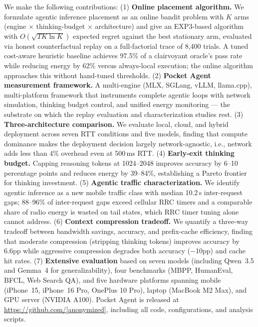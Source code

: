 \documentclass[sigconf,anonymous,review]{acmart}
\begin{document}
\medskip
\noindent We make the following contributions:
(1) \textbf{Online placement algorithm.} We formulate agentic inference placement as an online bandit problem with $K$ arms (engine $\times$ thinking-budget $\times$ architecture) and give an EXP3-based algorithm with $O(\sqrt{TK\ln K})$ expected regret against the best stationary arm, evaluated via honest counterfactual replay on a full-factorial trace of 8{,}400 trials. A tuned cost-aware heuristic baseline achieves 97.5\% of a clairvoyant oracle's pass rate while reducing energy by 62\% versus always-local execution; the online algorithm approaches this without hand-tuned thresholds.
(2) \textbf{Pocket Agent measurement framework.} A multi-engine (MLX, SGLang, vLLM, llama.cpp), multi-platform framework that instruments complete agentic loops with network simulation, thinking budget control, and unified energy monitoring --- the substrate on which the replay evaluation and characterization studies rest.
(3) \textbf{Three-architecture comparison.} We evaluate local, cloud, and hybrid deployment across seven RTT conditions and five models, finding that compute dominance makes the deployment decision largely network-agnostic, i.e., network adds less than 4\% overhead even at 500\,ms RTT.
(4) \textbf{Early-exit thinking budget.} Capping reasoning tokens at 1024--2048 improves accuracy by 6--10 percentage points and reduces energy by 39--84\%, establishing a Pareto frontier for thinking investment.
(5) \textbf{Agentic traffic characterization.} We identify agentic inference as a new mobile traffic class with median 10.2\,s inter-request gaps; 88--96\% of inter-request gaps exceed cellular RRC timers and a comparable share of radio energy is wasted on tail states, which RRC timer tuning alone cannot address.
(6) \textbf{Context compression tradeoff.} We quantify a three-way tradeoff between bandwidth savings, accuracy, and prefix-cache efficiency, finding that moderate compression (stripping thinking tokens) improves accuracy by 6.6pp while aggressive compression degrades both accuracy ($-$10pp) and cache hit rates.
(7) \textbf{Extensive evaluation} based on seven models (including Qwen~3.5 and Gemma~4 for generalizability), four benchmarks (MBPP, HumanEval, BFCL, Web Search QA), and five hardware platforms spanning mobile (iPhone~15, iPhone~16 Pro, OnePlus 10 Pro), laptop (MacBook M2 Max), and GPU server (NVIDIA A100).
Pocket Agent is released at \url{https://github.com/[anonymized]}, including all code, configurations, and analysis scripts.

\end{document}
